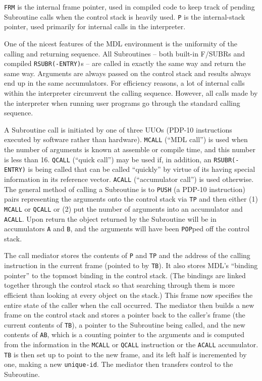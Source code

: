 \documentclass[a4paper]{scrbook}
\begin{document}
\texttt{FRM} is the internal frame pointer, used in compiled code to keep track of pending Subroutine calls when the
control stack is heavily used. \texttt{P} is the internal-stack pointer, used primarily for internal calls in the
interpreter.

One of the nicest features of the MDL environment is the uniformity of the calling and returning sequence. All Subroutines
-- both built-in F/SUBRs and compiled \texttt{RSUBR(-ENTRY)}s -- are called in exactly the same way and return the same
way. Arguments are always passed on the control stack and results always end up in the same accumulators. For efficiency
reasons, a lot of internal calls within the interpreter circumvent the calling sequence. However, all calls made by the
interpreter when running user programs go through the standard calling sequence.

A Subroutine call is initiated by one of three UUOs (PDP-10 instructions executed by software rather than hardware).
\texttt{MCALL} (``MDL call'') is used when the number of arguments is known at assemble or compile time, and this number is
less than 16. \texttt{QCALL} (``quick call'') may be used if, in addition, an \texttt{RSUBR(-ENTRY)} is being called that
can be called ``quickly'' by virtue of its having special information in its reference vector. \texttt{ACALL}
(``accumulator call'') is used otherwise. The general method of calling a Subroutine is to \texttt{PUSH} (a PDP-10
instruction) pairs representing the arguments onto the control stack via \texttt{TP} and then either (1) \texttt{MCALL} or
\texttt{QCALL} or (2) put the number of arguments into an accumulator and \texttt{ACALL}. Upon return the object returned
by the Subroutine will be in accumulators \texttt{A} and \texttt{B}, and the arguments will have been \texttt{POP}ped off
the control stack.

The call mediator stores the contents of \texttt{P} and \texttt{TP} and the address of the calling instruction in the
current frame (pointed to by \texttt{TB}). It also stores MDL's ``binding pointer'' to the topmost binding in the control
stack. (The bindings are linked together through the control stack so that searching through them is more efficient than
looking at every object on the stack.) This frame now specifies the entire state of the caller when the call occurred. The
mediator then builds a new frame on the control stack and stores a pointer back to the caller's frame (the current contents
of \texttt{TB}), a pointer to the Subroutine being called, and the new contents of \texttt{AB}, which is a counting pointer
to the arguments and is computed from the information in the \texttt{MCALL} or \texttt{QCALL} instruction or the
\texttt{ACALL} accumulator. \texttt{TB} is then set up to point to the new frame, and its left half is incremented by one,
making a new \texttt{unique-id}. The mediator then transfers control to the Subroutine.
\end{document}
